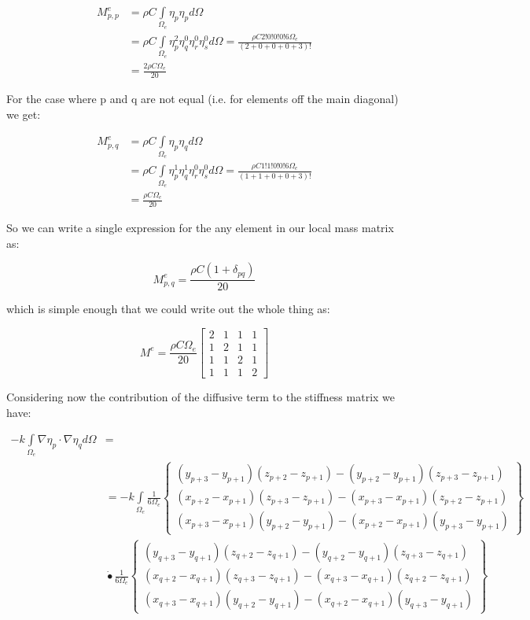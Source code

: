 \documentclass[12pt]{article}
\begin{document}
\begin{align*}
 M_{p,p}^e & = \rho C  \int\limits_{\Omega_e} \eta_p \eta_p d\Omega \\
              	& = \rho C \int\limits_{\Omega_e} \eta_p^2 \eta_q^0 \eta_r^0 \eta_s^0 d{\Omega}=
 \frac{\rho C 2!0!0!0!6\Omega_e}{(2+0+0+0+3)!} \\
 				& = \frac{2\rho C \Omega_e}{20}
\end{align*}

For the case where p and q are not equal (i.e. for elements off the main diagonal) we get:

\begin{align*}
 M_{p,q}^e & = \rho C \int\limits_{\Omega_e} \eta_p \eta_q d\Omega \\
              	& = \rho C \int\limits_{\Omega_e} \eta_p^1 \eta_q^1 \eta_r^0 \eta_s^0 d{\Omega}=
 \frac{\rho C 1!1!0!0!6\Omega_e}{(1+1+0+0+3)!} \\
 				& = \frac{\rho C \Omega_e}{20}
\end{align*}

So we can write a single expression for the any element in our local mass matrix as:

$$
M_{p,q}^e = \frac{\rho C (1+\delta_{pq})}{20}
$$

which is simple enough that we could write out the whole thing as:

\begin{equation}
M^e = \frac{\rho C \Omega_e}{20}{\begin{bmatrix} 2 & 1 & 1 & 1 \\ 1 & 2 & 1 & 1 \\ 1 & 1 & 2 & 1 \\ 1 & 1 & 1 & 2 \end{bmatrix}}
\end{equation}

Considering now the contribution of the diffusive term to the stiffness matrix we have:


\begin{align*}
 -k\int\limits_{\Omega_e} \nabla \eta_p \cdot \nabla \eta_q d\Omega &= \\ 
 &= -k\int\limits_{\Omega_e} \frac{1}{6\Omega_e} 
 \begin{Bmatrix} 
 (y_{p+3}-y_{p+1})(z_{p+2}-z_{p+1})-(y_{p+2}-y_{p+1})(z_{p+3}-z_{p+1}) \\
 (x_{p+2}-x_{p+1})(z_{p+3}-z_{p+1})-(x_{p+3}-x_{p+1})(z_{p+2}-z_{p+1}) \\
 (x_{p+3}-x_{p+1})(y_{p+2}-y_{p+1})-(x_{p+2}-x_{p+1})(y_{p+3}-y_{p+1})
 \end{Bmatrix} \\
 &\dot{•} 
 \frac{1}{6\Omega_e} 
 \begin{Bmatrix} 
 (y_{q+3}-y_{q+1})(z_{q+2}-z_{q+1})-(y_{q+2}-y_{q+1})(z_{q+3}-z_{q+1}) \\
 (x_{q+2}-x_{q+1})(z_{q+3}-z_{q+1})-(x_{q+3}-x_{q+1})(z_{q+2}-z_{q+1}) \\
 (x_{q+3}-x_{q+1})(y_{q+2}-y_{q+1})-(x_{q+2}-x_{q+1})(y_{q+3}-y_{q+1})
 \end{Bmatrix}
\end{align*}
\end{document}
